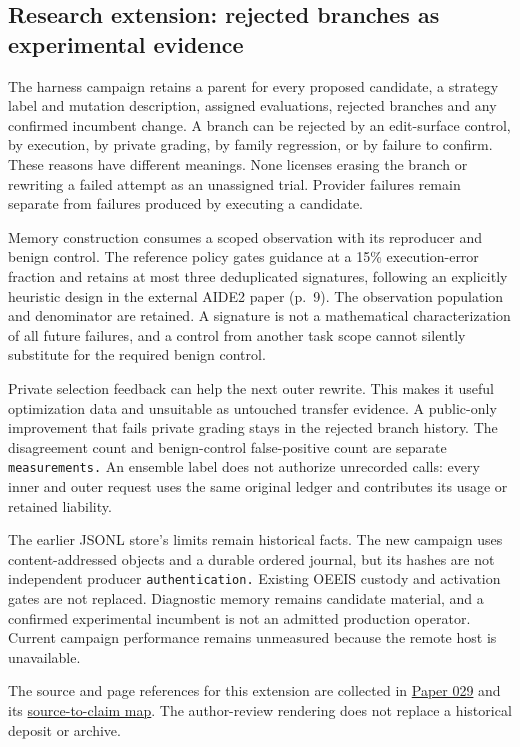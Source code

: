 \documentclass[
  11pt,
]{article}
\begin{document}
\subsection{Research extension: rejected branches as experimental
evidence}\label{research-extension-rejected-branches-as-experimental-evidence}

The harness campaign retains a parent for every proposed candidate, a
strategy label and mutation description, assigned evaluations, rejected
branches and any confirmed incumbent change. A branch can be rejected by
an edit-surface control, by execution, by private grading, by family
regression, or by failure to confirm. These reasons have different
meanings. None licenses erasing the branch or rewriting a failed attempt
as an unassigned trial. Provider failures remain separate from failures
produced by executing a candidate.

Memory construction consumes a scoped observation with its reproducer
and benign control. The reference policy gates guidance at a 15\%
execution-error fraction and retains at most three deduplicated
signatures, following an explicitly heuristic design in the external
AIDE2 paper (p.~9). The observation population and denominator are
retained. A signature is not a mathematical characterization of all
future failures, and a control from another task scope cannot silently
substitute for the required benign control.

Private selection feedback can help the next outer rewrite. This makes
it useful optimization data and unsuitable as untouched transfer
evidence. A public-only improvement that fails private grading stays in
the rejected branch history. The disagreement count and benign-control
false-positive count are separate \nolinkurl{measurements.} An ensemble
label does not authorize unrecorded calls: every inner and outer request
uses the same original ledger and contributes its usage or retained
liability.

The earlier JSONL store's limits remain historical facts. The new
campaign uses content-addressed objects and a durable ordered journal,
but its hashes are not independent producer \nolinkurl{authentication.}
Existing OEEIS custody and activation gates are not replaced. Diagnostic
memory remains candidate material, and a confirmed experimental
incumbent is not an admitted production operator. Current campaign
performance remains unmeasured because the remote host is unavailable.

The source and page references for this extension are collected in
\href{../029/paper.pdf}{Paper 029} and its
\href{../029/docs/source_to_claim_map.md}{source-to-claim map}. The
author-review rendering does not replace a historical deposit or
archive.
\end{document}
